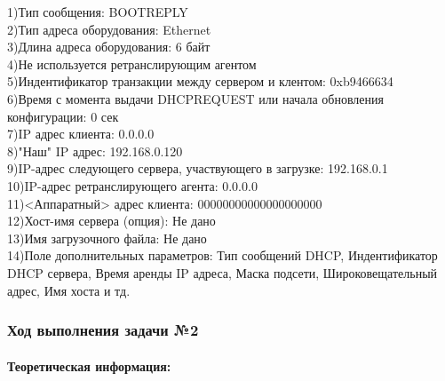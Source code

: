 \begin{itemize}
\begin{itemize}
    1)Тип сообщения: BOOTREPLY\\
    
    
    2)Тип адреса оборудования: Ethernet\\
    
    
    3)Длина адреса оборудования: 6 байт\\
    
    
    4)Не используется ретранслирующим агентом\\
    
    
    5)Индентификатор транзакции между сервером и клентом: 0xb9466634\\
    
    
    6)Время с момента выдачи DHCPREQUEST или начала обновления конфигурации: 0 сек\\
    
    
    7)IP адрес клиента: 0.0.0.0\\
    
    
    8)"Наш" IP адрес: 192.168.0.120\\
    
    
    9)IP-адрес следующего сервера, участвующего в загрузке: 192.168.0.1\\
    
    
    10)IP-адрес ретранслирующего агента: 0.0.0.0\\
    
    
    11)<Аппаратный> адрес клиента: 00000000000000000000\\
    
    
    12)Хост-имя сервера (опция): Не дано\\
    
    
    13)Имя загрузочного файла: Не дано\\
    
    
    14)Поле дополнительных параметров: Тип сообщений DHCP, Индентификатор DHCP сервера, Время аренды IP адреса, Маска подсети, Широковещательный адрес, Имя хоста и тд.\\
    
    
 \end{itemize}
\end{itemize}



\newpage

\subsubsection{Ход выполнения задачи №2}

\paragraph{Теоретическая информация:\cite{TCP}\\}


